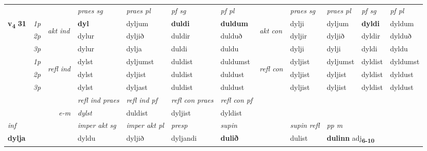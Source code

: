 \begin{longtable}[l]{X>{\footnotesize\itshape}llXXXXlXXXX}
 & &   & \textit{praes sg}  & \textit{praes pl}    & \textit{ pf sg} & \textit{pf pl} & & \textit{praes sg}  & \textit{praes pl}    & \textit{pf sg} & \textit{pf pl }  \\ \cmidrule{4-7} \cmidrule{9-12}
 \multirow{2}{*}{{{\textbf{v{\textsubscript{4}}} \Large{\textbf{31}}}}}  & 1p & \multirow{3}{*}{\begin{turn}{90}\textit{akt ind}\end{turn}} & \textbf{dyl} & dyljum & \textbf{duldi} & \textbf{duldum} & \multirow{3}{*}{\begin{turn}{90}\textit{akt con}\end{turn}} &dylji & dyljum & \textbf{dyldi} & dyldum\\*
 & 2p &  &  dylur  & dyljið & duldir & dulduð & & dyljir & dyljið & dyldir & dylduð \\*
 & 3p &  & dylur & dylja & duldi & duldu & & dylji & dylji& dyldi & dyldu \\*
\cmidrule{4-7} \cmidrule{9-12}
 & 1p & \multirow{3}{*}{\begin{turn}{90}\textit{refl ind}\end{turn}}  & dylst & dyljumst & duldist & duldumst & \multirow{3}{*}{\begin{turn}{90}\textit{refl con}\end{turn}}  &dyljist & dyljumst & dyldist & dyldumst \\*
 & 2p &  & dylst & dyljist & duldist & duldust & &dyljist & dyljist & dyldist & dyldust \\*
 & 3p  & & dylst & dyljast & duldist & duldust & & dyljist & dyljist& dyldist & dyldust \\*
\cmidrule{4-7} \cmidrule{9-12}

 & && \textit{refl ind praes} & \textit{refl ind pf} & \textit{refl con praes} & \textit{refl con pf} \\*
\multicolumn{3}{r}{\textit{e-m}}& dylst & duldist & dyljist & dyldist \\*

\cmidrule{4-7}
   {\textit{inf}} & &  & \textit{imper akt sg} & \textit{imper akt pl}   & \textit{presp} & \textit{supin} && \textit{supin refl} & \textit{pp m} \\*
  {\textbf{dylja}} & && dyldu  & dyljið   & dyljandi &  \textbf{dulið} && dulist & \multicolumn{2}{l}{\textbf{dulinn} adj\textbf{\textsubscript{6-10}}} \\*

\midrule


\end{longtable}
